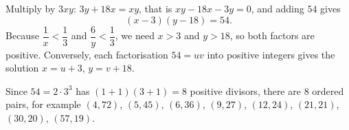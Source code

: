 Multiply by $3xy$: $3y+18x=xy$, that is $xy-18x-3y=0$, and adding $54$ gives
\[
(x-3)(y-18)=54 .
\]
Because $\dfrac{1}{x}<\dfrac{1}{3}$ and $\dfrac{6}{y}<\dfrac{1}{3}$, we need $x>3$ and $y>18$, so both factors are positive. Conversely, each factorisation $54=uv$ into positive integers gives the solution $x=u+3$, $y=v+18$.

Since $54=2\cdot3^3$ has $(1+1)(3+1)=8$ positive divisors, there are $\boxed{8}$ ordered pairs, for example $(4,72)$, $(5,45)$, $(6,36)$, $(9,27)$, $(12,24)$, $(21,21)$, $(30,20)$, $(57,19)$.
